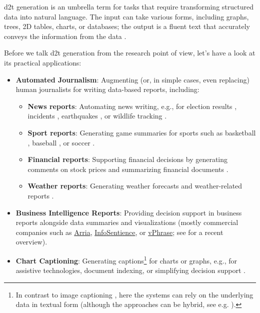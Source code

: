 {\ac{d2t} generation is an umbrella term for tasks that require transforming structured data into natural language. The input can take various forms, including graphs, trees, 2D tables, charts, or databases; the output is a fluent text that accurately conveys the information from the data \cite{gattSurveyStateArt2018,sharmaInnovationsNeuralDatatotext2022}.

Before we talk \ac{d2t} generation from the research point of view, let's have a look at its practical applications:

\begin{itemize}
    \item \textbf{Automated Journalism}: Augmenting (or, in simple cases, even replacing) human journalists for writing data-based reports, including:
          \begin{itemize}
              \item \textbf{News reports}: Automating news writing, e.g., for election results \cite{leppanen2017data}, incidents \cite{vanderleeCACAPODatasetMultilingual2020}, earthquakes \cite{oremus2014first}, or wildlife tracking \cite{siddharthan2012blogging,ponnamperuma2013tag2blog}.
              \item \textbf{Sport reports}: Generating game summaries for sports such as basketball \cite{wiseman2017challenges,thomson2020sportsett}, baseball \cite{puduppullyDatatotextGenerationEntity2019}, or soccer \cite{van2017pass}.
              \item \textbf{Financial reports}: Supporting financial decisions by generating comments on stock prices \cite{murakami2017learning,aoki2018generating} and summarizing financial documents \cite{chapman2022towards}.
              \item \textbf{Weather reports}: Generating weather forecasts and weather-related reports \cite{goldberg1994using,belz2005corpus,belz2008automatic,angeli-etal-2010-simple,balakrishnan2019constrained}.
          \end{itemize}
    \item \textbf{Business Intelligence Reports}: Providing decision support in business reports alongside data summaries and visualizations (mostly commercial companies such as \href{https://www.arria.com}{Arria}, \href{https://infosentience.com}{InfoSentience}, or \href{https://www.vphrase.com}{vPhrase}; see \citealp{daleNavigatingTextGeneration2023} for a recent overview).
    \item \textbf{Chart Captioning}: Generating captions\footnote{In contrast to image captioning \cite{stefanini2022show}, here the systems can rely on the underlying data in textual form (although the approaches can be hybrid, see e.g. \citealp{kantharajCharttoTextLargeScaleBenchmark2022}).} for charts or graphs, e.g., for assistive technologies, document indexing, or simplifying decision support \cite{demirGeneratingTextualSummaries2008,demirSummarizingInformationGraphics2012,obeidCharttoTextGeneratingNatural2020,kantharajCharttoTextLargeScaleBenchmark2022}.

\end{itemize}}
